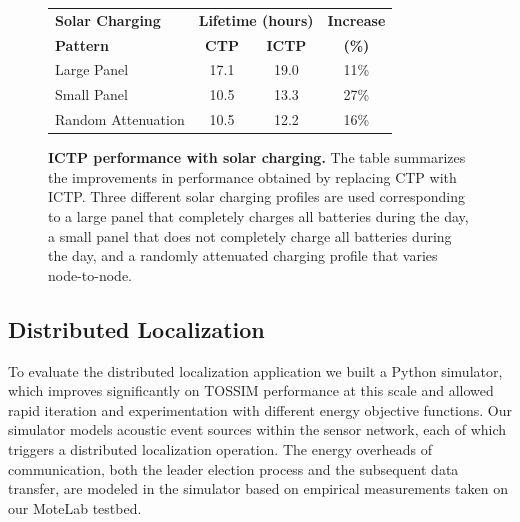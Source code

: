 \begin{figure}[t]
\begin{center}
\begin{tabular}{|l|ccc|}
\hline
\textbf{Solar Charging} & \multicolumn{2}{c}{\textbf{Lifetime (hours)}} & \textbf{Increase} \\
\textbf{Pattern} & \textbf{CTP} & \textbf{ICTP} & \textbf{(\%)} \\ \hline
Large Panel & 17.1 & 19.0 & 11\% \\
Small Panel & 10.5 & 13.3 & 27\% \\
Random Attenuation & 10.5 & 12.2 & 16\% \\ \hline
\end{tabular}
\end{center}

\caption{\textbf{ICTP performance with solar charging.} The table summarizes
the improvements in performance obtained by replacing CTP with ICTP. Three
different solar charging profiles are used corresponding to a large panel
that completely charges all batteries during the day, a small panel that does
not completely charge all batteries during the day, and a randomly attenuated
charging profile that varies node-to-node.}

\label{idea-table-ictpvoptimaltossim}
\end{figure}

\subsection{Distributed Localization}

To evaluate the distributed localization application we built a Python
simulator, which improves significantly on TOSSIM performance at this scale
and allowed rapid iteration and experimentation with different energy
objective functions. Our simulator models acoustic event sources within the
sensor network, each of which triggers a distributed localization operation.
The energy overheads of communication, both the leader election process and
the subsequent data transfer, are modeled in the simulator based on empirical
measurements taken on our MoteLab testbed.

